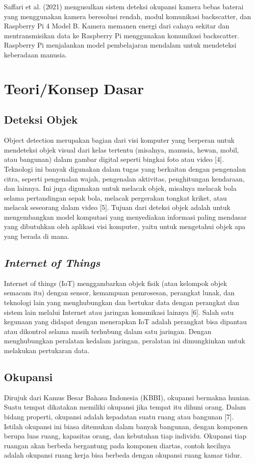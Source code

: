 Saffari et al. (2021) mengusulkan sistem deteksi okupansi kamera bebas baterai yang menggunakan kamera beresolusi rendah, modul komunikasi backscatter, dan Raspberry Pi 4 Model B. Kamera memanen energi dari cahaya sekitar dan mentransmisikan data ke Raspberry Pi menggunakan komunikasi backscatter. Raspberry Pi menjalankan model pembelajaran mendalam untuk mendeteksi keberadaan manusia.

\section{Teori/Konsep Dasar}

\subsection{Deteksi Objek}
Object detection merupakan bagian dari visi komputer yang berperan untuk mendeteksi objek visual dari kelas tertentu (misalnya, manusia, hewan, mobil, atau bangunan) dalam gambar digital seperti bingkai foto atau video [4]. Teknologi ini banyak digunakan dalam tugas yang berkaitan dengan pengenalan citra, seperti pengenalan wajah, pengenalan aktivitas, penghitungan kendaraan, dan lainnya. Ini juga digunakan untuk melacak objek, misalnya melacak bola selama pertandingan sepak bola, melacak pergerakan tongkat kriket, atau melacak seseorang dalam video [5]. Tujuan dari deteksi objek adalah untuk mengembangkan model komputasi yang menyediakan informasi paling mendasar yang dibutuhkan oleh aplikasi visi komputer, yaitu untuk mengetahui objek apa yang berada di mana.

\subsection{\emph{Internet of Things}}
Internet of things (IoT) menggambarkan objek fisik (atau kelompok objek semacam itu) dengan sensor, kemampuan pemrosesan, perangkat lunak, dan teknologi lain yang menghubungkan dan bertukar data dengan perangkat dan sistem lain melalui Internet atau jaringan komunikasi lainnya [6]. Salah satu kegunaan yang didapat dengan menerapkan IoT adalah perangkat bisa dipantau atau dikontrol selama masih terhubung dalam satu jaringan. Dengan menghubungkan peralatan kedalam jaringan, peralatan ini dimungkinkan untuk melakukan pertukaran data.

\subsection{Okupansi}
Dirujuk dari Kamus Besar Bahasa Indonesia (KBBI), okupansi bermakna hunian. Suatu tempat dikatakan memiliki okupansi jika tempat itu dihuni orang. Dalam bidang properti, okupansi adalah kepadatan suatu ruang atau bangunan [7]. Istilah okupansi ini biasa ditemukan dalam banyak bangunan, dengan komponen berupa luas ruang, kapasitas orang, dan kebutuhan tiap individu. Okupansi tiap ruangan akan berbeda bergantung pada komponen diartas, contoh kecilnya adalah okupansi ruang kerja bisa berbeda dengan okupansi ruang kamar tidur. 

